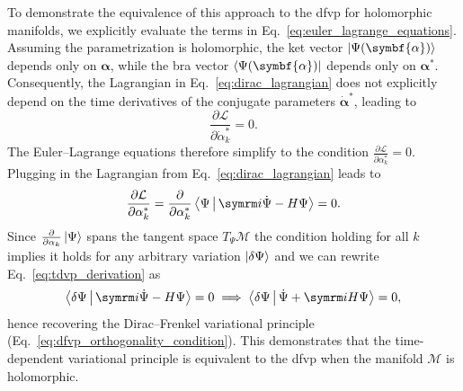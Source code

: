 To demonstrate the equivalence of this approach to the \gls{dfvp} for holomorphic manifolds, we explicitly evaluate the terms in Eq.~\eqref{eq:euler_lagrange_equations}. Assuming the parametrization is holomorphic, the ket vector $\ket{\Psi(\symbf{\alpha})}$ depends only on $\symbf{\alpha}$, while the bra vector $\bra{\Psi(\symbf{\alpha})}$ depends only on $\symbf{\alpha}^\ast$. Consequently, the Lagrangian in Eq.~\eqref{eq:dirac_lagrangian} does not explicitly depend on the time derivatives of the conjugate parameters $\dot{\symbf{\alpha}}^\ast$, leading to
\begin{equation}
\frac{\partial\mathcal{L}}{\partial\dot{\alpha}_k^\ast}=0.
\end{equation}
The Euler--Lagrange equations therefore simplify to the condition $\frac{\partial\mathcal{L}}{\partial\alpha_k^\ast}=0$. Plugging in the Lagrangian from Eq.~\eqref{eq:dirac_lagrangian} leads to
\begin{equation}\label{eq:tdvp_derivation}
\frac{\partial\mathcal{L}}{\partial\alpha_k^\ast}=\frac{\partial}{\partial\alpha_k^\ast}\Braket{\Psi|\i\dot\Psi-H\Psi}=0.
\end{equation}
Since $\frac{\partial}{\partial\alpha_k}\ket{\Psi}$ spans the tangent space $T_{\Psi}\mathcal{M}$ the condition holding for all $k$ implies it holds for any arbitrary variation $\ket{\delta\Psi}$ and we can rewrite Eq.~\eqref{eq:tdvp_derivation} as
\begin{equation}
\Braket{\delta\Psi|\i\dot\Psi-H\Psi}=0\implies\Braket{\delta\Psi|\dot\Psi+\i H\Psi}=0,
\end{equation}
hence recovering the Dirac--Frenkel variational principle (Eq.~\eqref{eq:dfvp_orthogonality_condition}). This demonstrates that the time-dependent variational principle is equivalent to the \gls{dfvp} when the manifold $\mathcal{M}$ is holomorphic.
